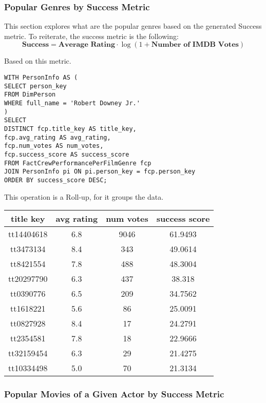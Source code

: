 \documentclass[sigconf, pbalance]{acmart}
\begin{document}
\subsubsection{Popular Genres by Success Metric}

This section explores what are the popular genres based on the generated Success metric. To reiterate, the success metric is the following:
$$
\textbf{Success} = \textbf{Average Rating} \cdot \log(1 + \textbf{Number of IMDB Votes})
$$

Based on this metric.


\begin{lstlisting}[style=SQLStyle]
WITH PersonInfo AS (
SELECT person_key
FROM DimPerson
WHERE full_name = 'Robert Downey Jr.'  
)
SELECT
DISTINCT fcp.title_key AS title_key,
fcp.avg_rating AS avg_rating,
fcp.num_votes AS num_votes,
fcp.success_score AS success_score
FROM FactCrewPerformancePerFilmGenre fcp
JOIN PersonInfo pi ON pi.person_key = fcp.person_key
ORDER BY success_score DESC;
\end{lstlisting}

This operation is a Roll-up, for it groups the data.

\begin{center}
\begin{tabular}{|c|c|c|c|}
\hline
title key & avg rating & num votes & success score \\
\hline
tt14404618 & 6.8 & 9046 & 61.9493 \\
tt3473134 & 8.4 & 343 & 49.0614 \\
tt8421554 & 7.8 & 488 & 48.3004 \\
tt20297790 & 6.3 & 437 & 38.318 \\
tt0390776 & 6.5 & 209 & 34.7562 \\
tt1618221 & 5.6 & 86 & 25.0091 \\
tt0827928 & 8.4 & 17 & 24.2791 \\
tt2354581 & 7.8 & 18 & 22.9666 \\
tt32159454 & 6.3 & 29 & 21.4275 \\
tt10334498 & 5.0 & 70 & 21.3134 \\
\hline
\end{tabular}
\end{center}


\subsubsection{Popular Movies of a Given Actor by Success Metric}
\end{document}
